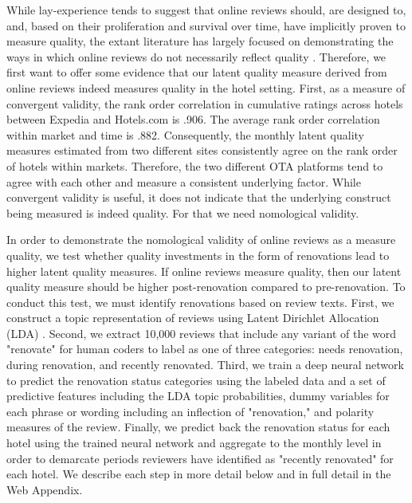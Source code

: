 \documentclass[mksc,blindrev]{informs3} %
\begin{document}
While lay-experience tends to suggest that online reviews should, are designed to, and, based on their proliferation and survival over time, have implicitly proven to measure quality, the extant literature has largely focused on demonstrating the ways in which online reviews do not necessarily reflect quality \citep{mcauley2013amateurs, moe2012online, mayzlin2014promotional}. Therefore, we first want to offer some evidence that our latent quality measure derived from online reviews indeed measures quality in the hotel setting. First, as a measure of convergent validity, the rank order correlation in cumulative ratings across hotels between Expedia and Hotels.com is .906. The average rank order correlation within market and time is .882. Consequently, the monthly latent quality measures estimated from two different sites consistently agree on the rank order of hotels within markets. Therefore, the two different OTA platforms tend to agree with each other and measure a consistent underlying factor. While convergent validity is useful, it does not indicate that the underlying construct being measured is indeed quality. For that we need nomological validity.

In order to demonstrate the nomological validity of online reviews as a measure quality, we test whether quality investments in the form of renovations lead to higher latent quality measures. If online reviews measure quality, then our latent quality measure should be higher post-renovation compared to pre-renovation. To conduct this test, we must identify renovations based on review texts. First, we construct a topic representation of reviews using Latent Dirichlet Allocation (LDA) \citep{blei2003latent, wang2018and}. Second, we extract 10,000 reviews that include any variant of the word "renovate" for human coders to label as one of three categories: needs renovation, during renovation, and recently renovated. Third, we train a deep neural network to predict the renovation status categories using the labeled data and a set of predictive features including the LDA topic probabilities, dummy variables for each phrase or wording including an inflection of "renovation," and polarity measures of the review. Finally, we predict back the renovation status for each hotel using the trained neural network and aggregate to the monthly level in order to demarcate periods reviewers have identified as "recently renovated" for each hotel. We describe each step in more detail below and in full detail in the Web Appendix. %
\end{document}
